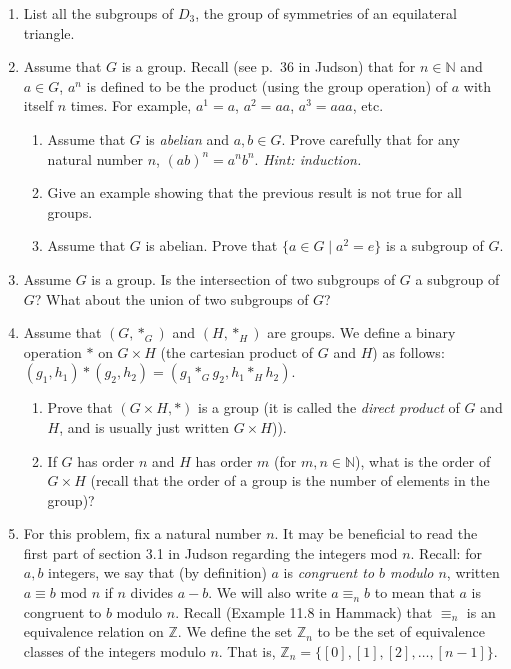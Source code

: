 \documentclass{amsart}
\theoremstyle{definition}
\begin{document}
\begin{enumerate}
\item List all the subgroups of $D_3$, the group of symmetries of an equilateral triangle.
\item Assume that $G$ is a group. Recall (see p.~36 in Judson) that for $n \in \mathbb{N}$ and $a \in G$, $a^n$ is defined to be the product (using the group operation) of $a$ with itself $n$ times. For example, $a^1 = a$, $a^2 = a a$, $a^3 = a a a$, etc.
  \begin{enumerate}
  \item Assume that $G$ is \emph{abelian} and $a, b \in G$. Prove carefully that for any natural number $n$, $(ab)^n = a^n b^n$. \emph{Hint: induction.}
  \item Give an example showing that the previous result is not true for all groups.
  \item Assume that $G$ is abelian. Prove that $\{a \in G \mid a^2 = e\}$ is a subgroup of $G$.
  \end{enumerate}

\item Assume $G$ is a group. Is the intersection of two subgroups of $G$ a subgroup of $G$? What about the union of two subgroups of $G$?
\item Assume that $(G, \ast_G)$ and $(H, \ast_H)$ are groups. We define a binary operation $\ast$ on $G \times H$ (the cartesian product of $G$ and $H$) as follows: $(g_1, h_1) \ast (g_2, h_2) = (g_1 \ast_G g_2, h_1 \ast_H h_2)$.
  \begin{enumerate}
  \item Prove that $(G \times H, \ast)$ is a group (it is called the \emph{direct product} of $G$ and $H$, and is usually just written $G \times H$)).
  \item If $G$ has order $n$ and $H$ has order $m$ (for $m, n \in \mathbb{N}$), what is the order of $G \times H$ (recall that the order of a group is the number of elements in the group)?
  \end{enumerate}
\item For this problem, fix a natural number $n$. It may be beneficial to read the first part of section 3.1 in Judson regarding the integers mod $n$. Recall: for $a, b$ integers, we say that (by definition) $a$ is \emph{congruent to $b$ modulo $n$}, written $a \equiv b \text{ mod } n$ if $n$ divides $a - b$. We will also write $a \equiv_n b$ to mean that $a$ is congruent to $b$ modulo $n$. Recall (Example 11.8 in Hammack) that $\equiv_n$ is an equivalence relation on $\mathbb{Z}$. We define the set $\mathbb{Z}_n$ to be the set of equivalence classes of the integers modulo $n$. That is, $\mathbb{Z}_n = \{[0], [1], [2], \ldots, [n - 1]\}$. 


\end{enumerate}
\end{document}

